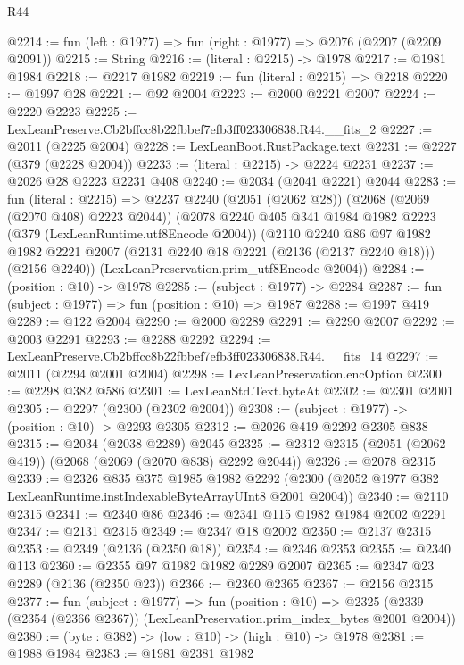 \begin{lexlean}{R44}
\begin{coremodule}
@2214 := fun (left : @1977) => fun (right : @1977) => @2076 (@2207 (@2209 @2091))
@2215 := String
@2216 := (literal : @2215) -> @1978
@2217 := @1981 @1984
@2218 := @2217 @1982
@2219 := fun (literal : @2215) => @2218
@2220 := @1997 @28
@2221 := @92 @2004
@2223 := @2000 @2221 @2007
@2224 := @2220 @2223
@2225 := LexLeanPreserve.Cb2bffcc8b22fbbef7efb3ff023306838.R44.__fits_2
@2227 := @2011 (@2225 @2004)
@2228 := LexLeanBoot.RustPackage.text
@2231 := @2227 (@379 (@2228 @2004))
@2233 := (literal : @2215) -> @2224 @2231
@2237 := @2026 @28 @2223 @2231 @408
@2240 := @2034 (@2041 @2221) @2044
@2283 := fun (literal : @2215) =>
  @2237
    @2240
    (@2051 (@2062 @28))
    (@2068 (@2069 (@2070 @408) @2223 @2044))
    (@2078
      @2240
      @405
      @341
      @1984
      @1982
      @2223
      (@379 (LexLeanRuntime.utf8Encode @2004))
      (@2110
        @2240
        @86
        @97
        @1982
        @1982
        @2221
        @2007
        (@2131 @2240 @18 @2221 (@2136 (@2137 @2240 @18)))
        (@2156 @2240))
      (LexLeanPreservation.prim_utf8Encode @2004))
@2284 := (position : @10) -> @1978
@2285 := (subject : @1977) -> @2284
@2287 := fun (subject : @1977) => fun (position : @10) => @1987
@2288 := @1997 @419
@2289 := @122 @2004
@2290 := @2000 @2289
@2291 := @2290 @2007
@2292 := @2003 @2291
@2293 := @2288 @2292
@2294 := LexLeanPreserve.Cb2bffcc8b22fbbef7efb3ff023306838.R44.__fits_14
@2297 := @2011 (@2294 @2001 @2004)
@2298 := LexLeanPreservation.encOption
@2300 := @2298 @382 @586
@2301 := LexLeanStd.Text.byteAt
@2302 := @2301 @2001
@2305 := @2297 (@2300 (@2302 @2004))
@2308 := (subject : @1977) -> (position : @10) -> @2293 @2305
@2312 := @2026 @419 @2292 @2305 @838
@2315 := @2034 (@2038 @2289) @2045
@2325 := @2312 @2315 (@2051 (@2062 @419)) (@2068 (@2069 (@2070 @838) @2292 @2044))
@2326 := @2078 @2315
@2339 := @2326
    @835
    @375
    @1985
    @1982
    @2292
    (@2300 (@2052 @1977 @382 LexLeanRuntime.instIndexableByteArrayUInt8 @2001 @2004))
@2340 := @2110 @2315
@2341 := @2340 @86
@2346 := @2341 @115 @1982 @1984 @2002 @2291
@2347 := @2131 @2315
@2349 := @2347 @18 @2002
@2350 := @2137 @2315
@2353 := @2349 (@2136 (@2350 @18))
@2354 := @2346 @2353
@2355 := @2340 @113
@2360 := @2355 @97 @1982 @1982 @2289 @2007
@2365 := @2347 @23 @2289 (@2136 (@2350 @23))
@2366 := @2360 @2365
@2367 := @2156 @2315
@2377 := fun (subject : @1977) =>
  fun (position : @10) =>
  @2325 (@2339 (@2354 (@2366 @2367)) (LexLeanPreservation.prim_index_bytes @2001 @2004))
@2380 := (byte : @382) -> (low : @10) -> (high : @10) -> @1978
@2381 := @1988 @1984
@2383 := @1981 @2381 @1982

\end{coremodule}
\end{lexlean}
